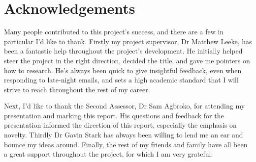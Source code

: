 \section*{Acknowledgements}

\vspace{2cm}

\large

Many people contributed to this project's success, and there are a few in particular I'd like to thank.
Firstly my project supervisor, Dr Matthew Leeke, has been a fantastic help throughout the project's development.
He initially helped steer the project in the right direction, decided the title, and gave me pointers on how to research.
He's always been quick to give insightful feedback, even when responding to late-night emails, and sets a high academic standard that I will strive to reach throughout the rest of my career.

Next, I'd like to thank the Second Assessor, Dr Sam Agbroko, for attending my presentation and marking this report.
His questions and feedback for the presentation informed the direction of this report, especially the emphasis on novelty.
Thirdly Dr Gavin Stark has always been willing to lend me an ear and bounce my ideas around.
Finally, the rest of my friends and family have all been a great support throughout the project, for which I am very grateful.
